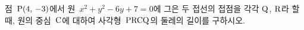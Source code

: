 점~$\mathrm{P}(4,\,-3)$에서 원~$x^2+y^2-6y+7=0$에 그은 두 접선의 접점을 각각 $\mathrm{Q}$, $\mathrm{R}$라 할 때, 원의 중심~$\mathrm{C}$에 대하여 사각형~$\mathrm{PRCQ}$의 둘레의 길이를 구하시오.
